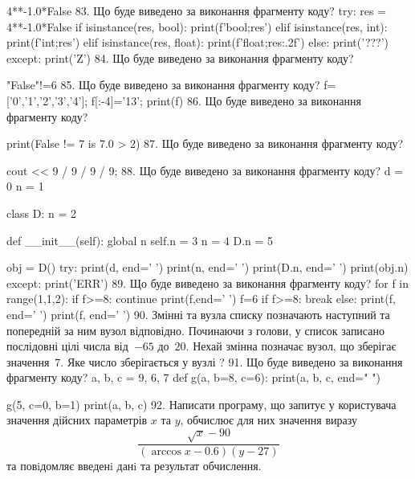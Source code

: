 \documentclass[11pt]{article}
\begin{document}
4**-1.0*False
\vspace{5mm}
83. Що буде виведено за виконання фрагменту коду?
try:
    res = 4**-1.0*False
    if isinstance(res, bool):
        print(f'bool;{res}')
    elif isinstance(res, int):
        print(f'int;{res}')
    elif isinstance(res, float):
        print(f'float;{res:.2f}')
    else:
        print('???')
except:
    print('Z')
\vspace{5mm}
84. Що буде виведено за виконання фрагменту коду?

"False"!=6
\vspace{5mm}
85. Що буде виведено за виконання фрагменту коду?
f=['0','1','2','3','4']; f[:-4]='13'; print(f)\vspace{5mm}
86. Що буде виведено за виконання фрагменту коду?

print(False != 7 is 7.0 > 2)
\vspace{5mm}
87. Що буде виведено за виконання фрагменту коду?

cout << 9 / 9 / 9 / 9;
\vspace{5mm}
88. Що буде виведено за виконання фрагменту коду?
d = 0
n = 1

class D:
    n = 2
    
    def __init__(self):
global n        self.n = 3
        n = 4
        D.n = 5

obj = D()
try:
    print(d, end=' ')
    print(n, end=' ')
    print(D.n, end=' ')
    print(obj.n)
except:
    print('ERR')
\vspace{5mm}
89. Що буде виведено за виконання фрагменту коду?
for f in range(1,1,2):
    if f>=8:
        continue
        print(f,end=' ')
        f=6
    if f>=8:
        break
else:
    print(f, end=' ')
print(f, end=' ')
\vspace{5mm}
90. 
Змінні  та  вузла списку позначають наступний та попередній за ним вузол відповідно. Починаючи з голови, у список записано послідовні цілі числа від~$-65$ до~$20$. Нехай змінна  позначає вузол, що зберігає значення~$7$.
Яке число зберігається у вузлі  ?
\vspace{5mm}
91. Що буде виведено за виконання фрагменту коду?
a, b, c = 9, 6, 7
def g(a, b=8, c=6):
    print(a, b, c, end=" ")

g(5, c=0, b=1)
print(a, b, c)
\vspace{5mm}
92. 
Написати програму, що запитує у користувача значення дійсних параметрів $x$ та $y$, обчислює для них значення виразу 
$$\frac{\sqrt x - 90}{(\arccos x - 0.6) (y - 27)}$$ 
та повiдомляє введенi данi та результат обчислення.
\end{document}
